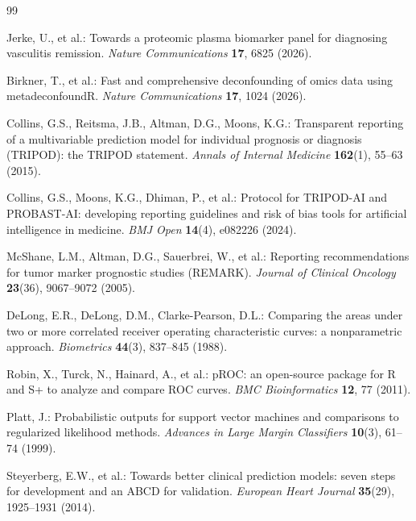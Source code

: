 \documentclass[11pt,twoside,openright]{book}
\begin{document}
\begin{thebibliography}{99}
\small

Jerke, U., et al.: Towards a proteomic plasma biomarker panel for diagnosing vasculitis remission.
\textit{Nature Communications} \textbf{17}, 6825 (2026).

Birkner, T., et al.: Fast and comprehensive deconfounding of omics data using metadeconfoundR.
\textit{Nature Communications} \textbf{17}, 1024 (2026).

Collins, G.S., Reitsma, J.B., Altman, D.G., Moons, K.G.: Transparent reporting of a multivariable prediction model for individual prognosis or diagnosis (TRIPOD): the TRIPOD statement.
\textit{Annals of Internal Medicine} \textbf{162}(1), 55--63 (2015).

Collins, G.S., Moons, K.G., Dhiman, P., et al.: Protocol for TRIPOD-AI and PROBAST-AI: developing reporting guidelines and risk of bias tools for artificial intelligence in medicine.
\textit{BMJ Open} \textbf{14}(4), e082226 (2024).

McShane, L.M., Altman, D.G., Sauerbrei, W., et al.: Reporting recommendations for tumor marker prognostic studies (REMARK).
\textit{Journal of Clinical Oncology} \textbf{23}(36), 9067--9072 (2005).

DeLong, E.R., DeLong, D.M., Clarke-Pearson, D.L.: Comparing the areas under two or more correlated receiver operating characteristic curves: a nonparametric approach.
\textit{Biometrics} \textbf{44}(3), 837--845 (1988).

Robin, X., Turck, N., Hainard, A., et al.: pROC: an open-source package for R and S+ to analyze and compare ROC curves.
\textit{BMC Bioinformatics} \textbf{12}, 77 (2011).

Platt, J.: Probabilistic outputs for support vector machines and comparisons to regularized likelihood methods.
\textit{Advances in Large Margin Classifiers} \textbf{10}(3), 61--74 (1999).

Steyerberg, E.W., et al.: Towards better clinical prediction models: seven steps for development and an ABCD for validation.
\textit{European Heart Journal} \textbf{35}(29), 1925--1931 (2014).


\end{thebibliography}
\end{document}
